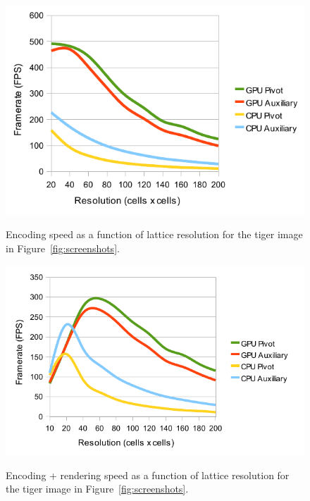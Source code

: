 \documentclass[11pt,a4paper,twoside]{article}
\begin{document}
\begin {figure} [t]
\centering
\begin {minipage} [b] {0.45\linewidth}
	\centering
	\includegraphics[width=1.0\columnwidth] {figures/graph_grid_encode}
	\caption {Encoding speed as a function of lattice resolution for the tiger image in Figure~\ref{fig:screenshots}.}
	\label {fig:graph_grid_encode}
\end {minipage}
\hspace{0.5cm}
\begin{minipage} [b] {0.45\linewidth}
	\centering
	\includegraphics[width=1.0\columnwidth] {figures/graph_grid_encode_render}
	\caption {Encoding + rendering speed as a function of lattice resolution for the tiger image in Figure~\ref{fig:screenshots}.}
	\label {fig:graph_grid_encode_render}
\end {minipage}
\end {figure}
\end{document}
